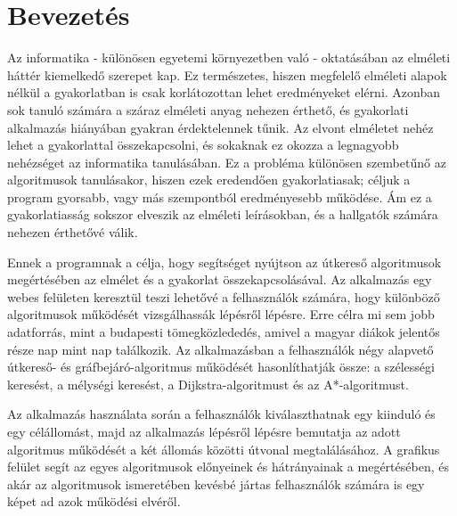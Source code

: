 \chapter{Bevezetés}
\label{ch:intro}

Az informatika - különösen egyetemi környezetben való - oktatásában az elméleti háttér kiemelkedő szerepet kap. Ez természetes, hiszen megfelelő elméleti alapok nélkül a gyakorlatban is csak korlátozottan lehet eredményeket elérni. Azonban sok tanuló számára a száraz elméleti anyag nehezen érthető, és gyakorlati alkalmazás hiányában gyakran érdektelennek tűnik. Az elvont elméletet nehéz lehet a gyakorlattal összekapcsolni, és sokaknak ez okozza a legnagyobb nehézséget az informatika tanulásában. Ez a probléma különösen szembetűnő az algoritmusok tanulásakor, hiszen ezek eredendően gyakorlatiasak; céljuk a program gyorsabb, vagy más szempontból eredményesebb működése. Ám ez a gyakorlatiasság sokszor elveszik az elméleti leírásokban, és a hallgatók számára nehezen érthetővé válik.

Ennek a programnak a célja, hogy segítséget nyújtson az útkereső algoritmusok megértésében az elmélet és a gyakorlat összekapcsolásával. Az alkalmazás egy webes felületen keresztül teszi lehetővé a felhasználók számára, hogy különböző algoritmusok működését vizsgálhassák lépésről lépésre. Erre célra mi sem jobb adatforrás, mint a budapesti tömegközlededés, amivel a magyar diákok jelentős része nap mint nap találkozik. Az alkalmazásban a felhasználók négy alapvető útkereső- és gráfbejáró-algoritmus működését hasonlíthatják össze: a szélességi keresést, a mélységi keresést, a Dijkstra-algoritmust és az A*-algoritmust.

\pagebreak
Az alkalmazás használata során a felhasználók kiválaszthatnak egy kiinduló és egy célállomást, majd az alkalmazás lépésről lépésre bemutatja az adott algoritmus működését a két állomás közötti útvonal megtalálásához. A grafikus felület segít az egyes algoritmusok előnyeinek és hátrányainak a megértésében, és akár az algoritmusok ismeretében kevésbé jártas felhasználók számára is egy képet ad azok működési elvéről.
